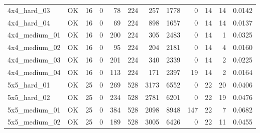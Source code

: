 \begin{tabular}{l l r r r r r r r r r r }
4x4\_hard\_03 & OK & 16 & 0 & 78 & 224 & 257 & 1778 & 0 & 14 & 14 & 0.0142 \\
4x4\_hard\_04 & OK & 16 & 0 & 69 & 224 & 898 & 1657 & 0 & 14 & 14 & 0.0137 \\
4x4\_medium\_01 & OK & 16 & 0 & 200 & 224 & 305 & 2483 & 0 & 14 & 1 & 0.0325 \\
4x4\_medium\_02 & OK & 16 & 0 & 95 & 224 & 204 & 2181 & 0 & 14 & 4 & 0.0160 \\
4x4\_medium\_03 & OK & 16 & 0 & 201 & 224 & 340 & 2339 & 0 & 14 & 2 & 0.0225 \\
4x4\_medium\_04 & OK & 16 & 0 & 113 & 224 & 171 & 2397 & 19 & 14 & 2 & 0.0164 \\
5x5\_hard\_01 & OK & 25 & 0 & 269 & 528 & 3173 & 6552 & 0 & 22 & 20 & 0.0406 \\
5x5\_hard\_02 & OK & 25 & 0 & 234 & 528 & 2781 & 6201 & 0 & 22 & 19 & 0.0476 \\
5x5\_medium\_01 & OK & 25 & 0 & 384 & 528 & 2098 & 8948 & 147 & 22 & 7 & 0.0682 \\
5x5\_medium\_02 & OK & 25 & 0 & 189 & 528 & 3005 & 6426 & 0 & 22 & 11 & 0.0455 \\
\hline
\end{tabular}
